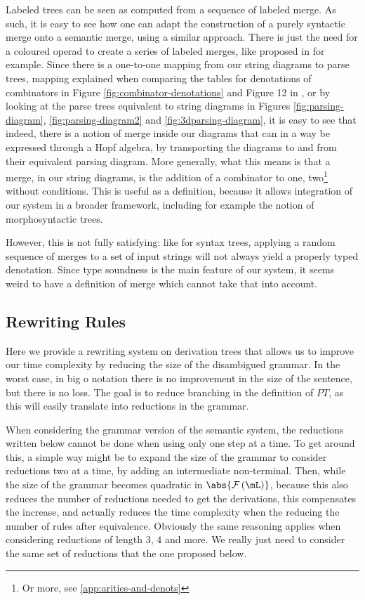 \medskip

Labeled trees can be seen as computed from a sequence of labeled merge.
As such, it is easy to see how one can adapt the construction of a purely
syntactic merge onto a semantic merge, using a similar approach.
There is just the need for a coloured operad to create a series of labeled
merges, like proposed in \cite{melliesCategoricalContoursChomskySchutzenberger2025}
for example.
Since there is a one-to-one mapping from our string diagrams to parse trees,
mapping explained when comparing the tables for denotations of combinators
in Figure \ref{fig:combinator-denotations} and Figure 12 in
\cite{bumfordEffectdrivenInterpretationFunctors2025}, or by looking at the
parse trees equivalent to string diagrams in Figures \ref{fig:parsing-diagram},
\ref{fig:parsing-diagram2} and \ref{fig:3dparsing-diagram}, it is easy to see
that indeed, there is a notion of merge inside our diagrams that can in a way
be expressed through a Hopf algebra, by transporting the diagrams to and from
their equivalent parsing diagram.
More generally, what this means is that a merge, in our string diagrams, is
the addition of a combinator to one, two\footnote{Or more, see
	\ref{app:arities-and-denots}} without conditions.
This is useful as a definition, because it allows integration of our system in
a broader framework, including for example the notion of morphosyntactic trees.

\medskip

However, this is not fully satisfying: like for syntax trees, applying a random
sequence of merges to a set of input strings will not always yield a properly
typed denotation.
Since type soundness is the main feature of our system, it seems weird to have
a definition of merge which cannot take that into account.

\subsection{Rewriting Rules}
\label{subsec:rewrite}
Here we provide a rewriting system on derivation trees that allows us to
improve our time complexity by reducing the size of the disambigued grammar.
In the worst case, in big o notation there is no improvement in the size of the
sentence, but there is no loss.
The goal is to reduce branching in the definition of $PT$, as this will easily
translate into reductions in the grammar.

\medskip

When considering the grammar version of the semantic system, the reductions
written below cannot be done when using only one step at a time.
To get around this, a simple way might be to expand the size of the grammar to
consider reductions two at a time, by adding an intermediate non-terminal.
Then, while the size of the grammar becomes quadratic in
$\abs{\mFunc\left(\mL\right)}$, because this also reduces the number of
reductions needed to get the derivations, this compensates the increase, and
actually reduces the time complexity when the reducing the number of rules
after equivalence.
Obviously the same reasoning applies when considering reductions of length $3$,
$4$ and more.
We really just need to consider the same set of reductions that the one
proposed below.

